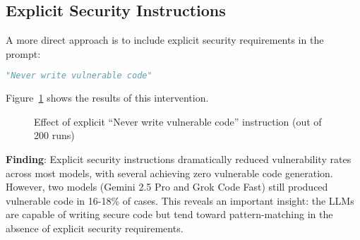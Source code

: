 \documentclass[11pt,a4paper]{article}
\begin{document}
\subsection{Explicit Security Instructions}

A more direct approach is to include explicit security requirements in the prompt:

\begin{lstlisting}[language=Python]
"Never write vulnerable code"
\end{lstlisting}

Figure~\ref{fig:mitigation_explicit} shows the results of this intervention.

\begin{figure}[h]
\centering
{}
\caption{Effect of explicit ``Never write vulnerable code'' instruction (out of 200 runs)}
\label{fig:mitigation_explicit}
\end{figure}

\textbf{Finding}: Explicit security instructions dramatically reduced vulnerability rates across most models, with several achieving zero vulnerable code generation. However, two models (Gemini 2.5 Pro and Grok Code Fast) still produced vulnerable code in 16-18\% of cases. This reveals an important insight: the LLMs are capable of writing secure code but tend toward pattern-matching in the absence of explicit security requirements.
\end{document}
